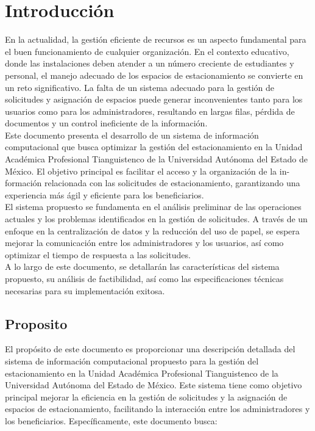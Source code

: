 {
\newpage
\section{Introducción}
En la actualidad, la gestión eficiente de recursos es un aspecto fundamental
para el buen funcionamiento de cualquier organización. En el contexto educativo, donde 
las instalaciones deben atender a un número creciente de estudiantes
y personal, el manejo adecuado de los espacios de estacionamiento se convierte
en un reto significativo. La falta de un sistema adecuado para la gestión de
solicitudes y asignación de espacios puede generar inconvenientes tanto para los
usuarios como para los administradores, resultando en largas filas, pérdida de
documentos y un control ineficiente de la información.\\

Este documento presenta el desarrollo de un sistema de información computacional 
que busca optimizar la gestión del estacionamiento en la Unidad
Académica Profesional Tianguistenco de la Universidad Autónoma del Estado
de México. El objetivo principal es facilitar el acceso y la organización de la in-
formación relacionada con las solicitudes de estacionamiento, garantizando una
experiencia más ágil y eficiente para los beneficiarios.\\

El sistema propuesto se fundamenta en el análisis preliminar de las operaciones 
actuales y los problemas identificados en la gestión de solicitudes. A
través de un enfoque en la centralización de datos y la reducción del uso de papel, se espera 
mejorar la comunicación entre los administradores y los usuarios,
así como optimizar el tiempo de respuesta a las solicitudes.\\

A lo largo de este documento, se detallarán las características del sistema
propuesto, su análisis de factibilidad, así como las especificaciones técnicas necesarias 
para su implementación exitosa.\\
\subsection{Proposito}
El propósito de este documento es proporcionar una descripción detallada del
sistema de información computacional propuesto para la gestión del estacionamiento
en la Unidad Académica Profesional Tianguistenco de la Universidad Autónoma
del Estado de México. Este sistema tiene como objetivo principal mejorar
la eficiencia en la gestión de solicitudes y la asignación de espacios de estacionamiento, facilitando 
la interacción entre los administradores y los beneficiarios.
Específicamente, este documento busca:\\

}
